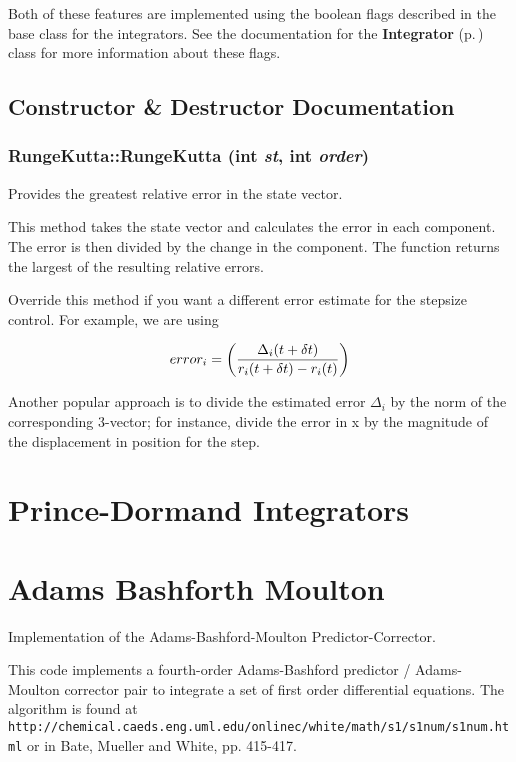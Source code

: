 Both of these features are implemented using the boolean flags
described in  the base class for the integrators. See the
documentation for the {\bf Integrator} {\rm
(p.\,\pageref{classIntegrator})} class for more information about
these flags.



\subsection{Constructor \& Destructor Documentation}
\subsubsection{\setlength{\rightskip}{0pt plus 5cm}Runge\-Kutta::Runge\-Kutta (int {\em st}, int {\em order})}\label{classRungeKutta_a0}



Provides the greatest relative error in the state vector.

This method takes the state vector and calculates the error in
each  component. The error is then divided by the change in the
component. The function returns the largest of the resulting
relative errors.

Override this method if you want a different error estimate for
the stepsize  control. For example, we are using

\[error_i = \left({{\Delta_i(t+\delta t)}\over {r_i(t+\delta t) - r_i(t)}}\right)\]

Another popular approach is to divide the estimated error
$\Delta_i$ by  the norm of the corresponding 3-vector; for
instance, divide the error in x  by the magnitude of the
displacement in position for the step.


\section{Prince-Dormand Integrators}

\section{Adams Bashforth Moulton}  

Implementation of the Adams-Bashford-Moulton Predictor-Corrector.

This code implements a fourth-order Adams-Bashford predictor /
Adams-Moulton corrector pair to integrate a set of first order
differential equations. The algorithm is found at  {\tt
http://chemical.caeds.eng.uml.edu/onlinec/white/math/s1/s1num/s1num.html}
or in Bate, Mueller and White, pp. 415-417.

